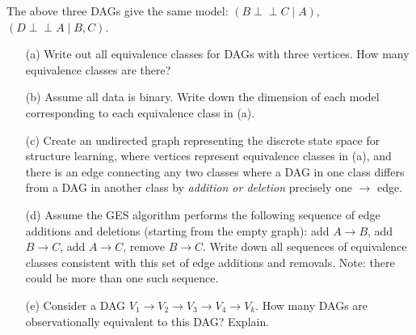 \documentclass[11pt]{article}
\def\ci{\perp\!\!\!\perp}
\begin{document}
\begin{center}
\end{center}
The above three DAGs give the same model: $(B \ci C \mid A)$, $(D \ci A \mid B,C)$.

\begin{enumerate}
\item[(a)] Write out all equivalence classes for DAGs with three vertices.  How many equivalence classes are there?
\item[(b)] Assume all data is binary.  Write down the dimension of each model corresponding to each equivalence class in (a).
\item[(c)] Create an undirected graph representing the discrete state space for structure learning, where vertices represent equivalence classes in (a), and there is an edge connecting any two classes where a DAG in one class differs from a DAG in another class by \emph{addition or deletion} precisely one $\to$ edge.
\item[(d)] 
Assume the GES algorithm performs the following sequence of edge additions and deletions (starting from the empty graph): add $A\to B$, add $B \to C$, add $A \to C$, remove $B \to C$.
Write down all sequences of equivalence classes consistent with this set of edge additions and removals.  Note: there could be more than one such sequence.

\item[(e)] Consider a DAG $V_1 \to V_2 \to V_3 \to V_4 \to V_k$.  How many DAGs are observationally equivalent to this DAG?  Explain.
\end{enumerate}
\end{document}
